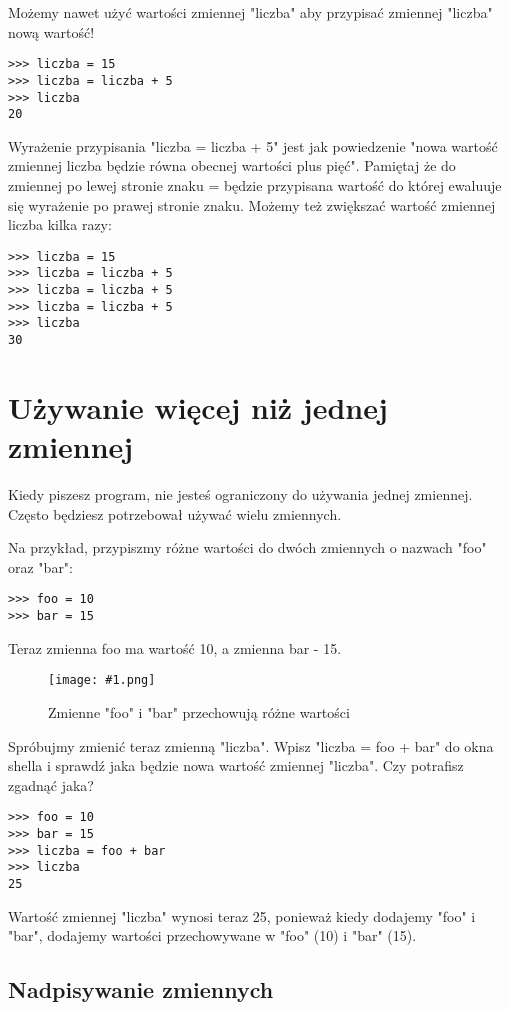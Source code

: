 \documentclass{book}
\newcommand{\img}[3]{
\begin{figure}
\centerline{
	\texttt{[image: \#1.png]}
}
\caption{#2}
\label{#1}
\end{figure}
}
\begin{document}
Możemy nawet użyć wartości zmiennej "liczba" aby przypisać zmiennej "liczba" nową wartość!

\begin{lstlisting}
>>> liczba = 15
>>> liczba = liczba + 5
>>> liczba
20
\end{lstlisting}

Wyrażenie przypisania "liczba = liczba + 5" jest jak powiedzenie "nowa wartość zmiennej liczba będzie równa obecnej wartości plus pięć". Pamiętaj że do zmiennej po lewej stronie znaku = będzie przypisana wartość do której ewaluuje się wyrażenie po prawej stronie znaku. Możemy też zwiększać wartość zmiennej liczba kilka razy:

\begin{lstlisting}
>>> liczba = 15
>>> liczba = liczba + 5
>>> liczba = liczba + 5
>>> liczba = liczba + 5
>>> liczba
30
\end{lstlisting}

\section{Używanie więcej niż jednej zmiennej}

Kiedy piszesz program, nie jesteś ograniczony do używania jednej zmiennej. Często będziesz potrzebował używać wielu zmiennych.

Na przykład, przypiszmy różne wartości do dwóch zmiennych o nazwach "foo" oraz "bar":

\begin{lstlisting}
>>> foo = 10
>>> bar = 15
\end{lstlisting}

Teraz zmienna foo ma wartość 10, a zmienna bar - 15.

\img{idle-zmienne}{Zmienne "foo" i "bar" przechowują różne wartości}{10cm}

Spróbujmy zmienić teraz zmienną "liczba". Wpisz "liczba = foo + bar" do okna shella i sprawdź jaka będzie nowa wartość zmiennej "liczba". Czy potrafisz zgadnąć jaka?

\begin{lstlisting}
>>> foo = 10
>>> bar = 15
>>> liczba = foo + bar
>>> liczba
25
\end{lstlisting}

Wartość zmiennej "liczba" wynosi teraz 25, ponieważ kiedy dodajemy "foo" i "bar", dodajemy wartości przechowywane w "foo" (10) i "bar" (15).

\subsection{Nadpisywanie zmiennych}
\end{document}

